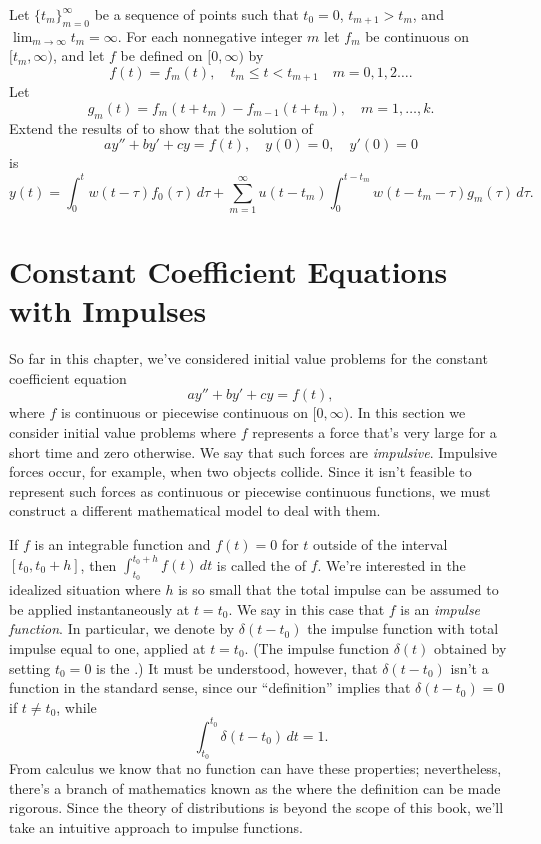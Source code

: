 \begin{exerciselist}
\item\label{exer:8.6.14}Let $\{t_m\}_{m=0}^\infty$  be a sequence of points such that $t_0=0$,
$t_{m+1}>t_m$,
and $\lim_{m\to\infty}t_m=\infty$. For each nonnegative integer $m$
let $f_m$ be continuous on $[t_m,\infty)$, and let
 $f$ be defined on $[0,\infty)$ by
\[
f(t)=f_m(t),\quad t_m\le t<t_{m+1}\quad  m=0,1,2\dots.
\]
Let
\[
g_m(t)=f_m(t+t_m)-f_{m-1}(t+t_m),\quad  m=1,\dots,k.
\]
Extend the results of  to show that the solution
of
\[
ay''+by'+cy=f(t),\quad y(0)=0,\quad y'(0)=0
\]
is
\[
y(t)=\int_0^t w(t-\tau)f_0(\tau)\,d\tau+\sum_{m=1}^\infty u(t-t_m)
\int_0^{t-t_m}w(t-t_m-\tau)g_m(\tau)
\,d\tau.
\]

\end{exerciselist}


\section{Constant Coefficient Equations with Impulses}
\label{sec:laplace_impulse}

So far in this chapter, we've considered initial value problems
for the constant coefficient equation
\[
ay''+by'+cy=f(t),
\]
where $f$ is continuous or piecewise continuous on $[0,\infty)$. In
this section we consider initial value problems where $f$
represents a force that's very large for a short time and
zero otherwise. We say that such forces are \emph{\color{blue}impulsive}.
Impulsive forces occur, for example, when two objects collide. Since
it isn't  feasible to represent such forces as continuous or
piecewise continuous functions, we must construct a different
mathematical model to deal with them.

If $f$ is an integrable function and $f(t)=0$ for $t$ outside of
the interval $[t_0,t_0+h]$, then $\int_{t_0}^{t_0+h} f(t)\,dt$ is
called the  of $f$. We're interested in the
idealized situation where $h$ is so small that the total impulse
can be assumed to be applied instantaneously at $t=t_0$. We say in
this case that $f$ is an
\emph{\color{blue}impulse function}.
In particular, we
denote by $\delta(t-t_0)$ the impulse function with total impulse
equal to one, applied at $t=t_0$. (The impulse function $\delta(t)$
obtained by setting $t_0=0$ is  the
.) It must be understood, however, that
$\delta(t-t_0)$ isn't  a function in the standard sense, since our
``definition'' implies that $\delta(t-t_0)=0$ if $t\ne t_0$, while
\[
\int_{t_0}^{t_0} \delta(t-t_0)\,dt=1.
\]
From calculus we know that no function can have these properties;
nevertheless, there's a branch of mathematics known as the
 where the definition can be made
rigorous. Since the theory of distributions is beyond the
scope of this book, we'll take an intuitive approach to impulse
functions.

